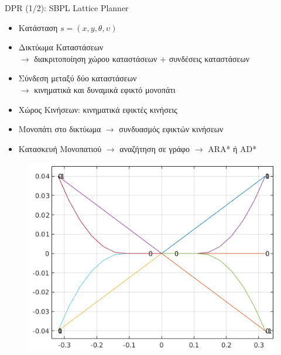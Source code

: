 \documentclass[10pt, compress, handout]{beamer} %
\begin{document}
\begin{frame}{DPR (1/2): SBPL Lattice Planner}
	\begin{itemize}
		\item Κατάσταση $s=(x,y,\theta,\upsilon)$
		\item Δικτύωμα Καταστάσεων\\$\rightarrow$ διακριτοποίηση χώρου καταστάσεων + συνδέσεις καταστάσεων
		\item Σύνδεση μεταξύ δύο καταστάσεων\\$\rightarrow$ κινηματικά και δυναμικά εφικτό μονοπάτι
		\item Χώρος Κινήσεων: κινηματικά εφικτές κινήσεις
		\item Μονοπάτι στο δικτύωμα $\rightarrow$ συνδυασμός εφικτών κινήσεων
		\item Κατασκευή Μονοπατιού $\rightarrow$ αναζήτηση σε γράφο $\rightarrow$ ARA* ή AD*
	\end{itemize}
	\begin{figure}
		\includegraphics[width=0.45\linewidth]{Figures/motion_primitives.png}
	\end{figure}
\end{frame}
\end{document}

